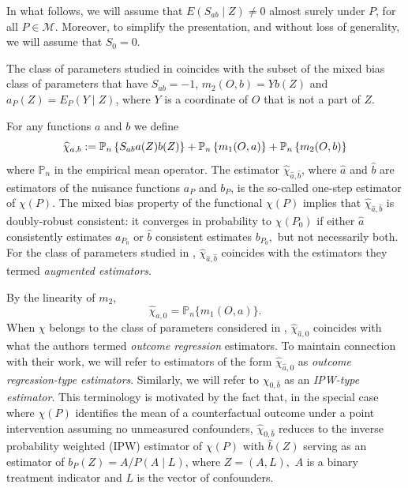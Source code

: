 \documentclass{article}
\begin{document}
In what follows, we will assume that $E(S_{ab}\mid Z)\neq 0$ almost surely
under $P$, for all $P\in \mathcal{M}$. Moreover, to simplify the
presentation, and without loss of generality, we will assume that $S_0=0$.

The class of parameters studied in \cite{bruns2025augmented} coincides with
the subset of the mixed bias class of parameters that have $S_{ab}=-1$, $%
m_2(O,b)=Yb(Z)$ and $a_{P}(Z)=E_{P}(Y\mid Z)$, where $Y$ is a coordinate of $O$ that is not a part of $Z$.

For any functions $a$ and $b$ we define 
\begin{equation*}
\widehat{\chi }_{a,b}:=\mathbb{P}_{n}\left\{ S_{ab}a(Z)b(Z)\right\} +\mathbb{%
P}_{n}\left\{ m_{1}(O,a)\right\} +\mathbb{P}_{n}\left\{ m_{2}(O,b)\right\} 
\end{equation*}%
where $\mathbb{P}_{n}$ in the empirical mean operator. The estimator $%
\widehat{\chi }_{\widehat{a},\widehat{b}}$, where $\widehat{a}$ and $\widehat{b}$ are estimators of
the nuisance functions $a_{P}$ and $b_{P}$, is the so-called one-step estimator of $%
\chi (P)$. The mixed bias property of the
functional $\chi \left( P\right) $ implies that  $\widehat{\chi }_{\widehat{a%
},\widehat{b}}$ is doubly-robust consistent: it converges in probability to $%
\chi \left( P_{0}\right) $ if either $\widehat{a}$ consistently estimates $%
a_{P_{0}}$ or $\widehat{b}$ consistent estimates $b_{P_{0}},$ but not
necessarily both. For the class of parameters studied in \cite%
{bruns2025augmented}, $\widehat{\chi }_{\widehat{a},\widehat{b}}$ coincides
with the estimators they termed \textit{augmented estimators}.

By the linearity of $m_{2}$, 
\begin{equation*}
\widehat{\chi }_{a,0}=\mathbb{P}_{n}\{m_{1}(O,a)\}.
\end{equation*}
When $\chi $ belongs to the class of parameters considered in \cite%
{bruns2025augmented}, $\widehat{\chi }_{\widehat{a},0}$ coincides with what
the authors termed \textit{outcome regression} estimators. To maintain
connection with their work, we will refer to estimators of the form $%
\widehat{\chi }_{\widehat{a},0}$ as \textit{outcome regression-type
estimators}. Similarly, we will refer to $\widehat{\chi }_{0,\widehat{b}}$
as an \textit{IPW-type estimator}. This terminology is motivated by the fact
that, in the special case where $\chi (P)$ identifies the mean of a counterfactual outcome under a point intervention assuming no unmeasured confounders, $\widehat{\chi }%
_{0,\widehat{b}}$ reduces to the inverse probability weighted (IPW)
estimator of $\chi \left( P\right) $ with $\widehat{b}(Z)$ serving as an
estimator of $b_{P}(Z)=A/P(A\mid L)$, where $Z=(A,L),$ $A$ is a binary
treatment indicator and $L$ is the vector of confounders.
\end{document}
